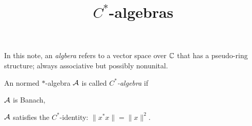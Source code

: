 \documentclass{../exp}
\title{$C^*$-algebras}
\begin{document}
\maketitle
\tableofcontents
\begin{defn*}
In this note, an \emph{algbera} refers to a vector space over $\mathbb{C}$ that has a pseudo-ring structure; always associative but possibly nonunital.
\end{defn*}
\begin{defn*}
An normed $*$-algebra $\mathcal{A}$ is called \emph{$C^*$-algebra} if
\begin{cond}
\item $\mathcal{A}$ is Banach,
\item $\mathcal{A}$ satisfies the $C^*$-identity: $\|x^*x\|=\|x\|^2$.
\end{cond}
\end{defn*}
\end{document}

